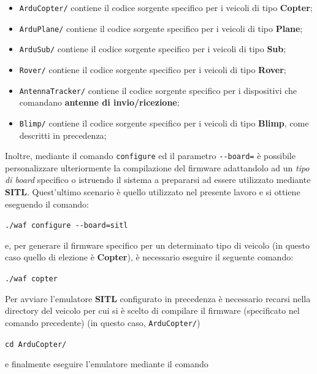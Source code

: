 \documentclass[a4paper, 12pt, oneside]{article}
\theoremstyle{definition}
\begin{document}
\begin{itemize}
    \item \texttt{ArduCopter/} contiene il codice sorgente specifico per i veicoli di tipo \textbf{Copter};
    \item \texttt{ArduPlane/} contiene il codice sorgente specifico per i veicoli di tipo \textbf{Plane};
    \item \texttt{ArduSub/} contiene il codice sorgente specifico per i veicoli di tipo \textbf{Sub};
    \item \texttt{Rover/} contiene il codice sorgente specifico per i veicoli di tipo \textbf{Rover};
    \item \texttt{AntennaTracker/} contiene il codice sorgente specifico per i dispositivi che comandano \textbf{antenne di invio/ricezione};
    \item \texttt{Blimp/} contiene il codice sorgente specifico per i veicoli di tipo \textbf{Blimp}, come descritti in precedenza;
\end{itemize}

Inoltre, mediante il comando \texttt{configure} ed il parametro \texttt{-{}-board=} è possibile personalizzare ulteriormente la compilazione del firmware adattandolo ad un \textit{tipo di board} specifico o istruendo il sistema a prepararsi ad essere utilizzato mediante \textbf{SITL}\cite{how-to-build-ardupilot}. Quest'ultimo scenario è quello utilizzato nel presente lavoro e si ottiene eseguendo il comando:

\begin{center}
    \texttt{./waf configure -{}-board=sitl}
\end{center}

e, per generare il firmware specifico per un determinato tipo di veicolo (in questo caso quello di elezione è \textbf{Copter}), è necessario eseguire il seguente comando:

\begin{center}
    \texttt{./waf copter}
\end{center}

Per avviare l'emulatore \textbf{SITL} configurato in precedenza è necessario recarsi nella directory del veicolo per cui si è scelto di compilare il firmware (specificato nel comando precedente) (in questo caso, \texttt{ArduCopter/})

\begin{center}
    \texttt{cd ArduCopter/}
\end{center}

e finalmente eseguire l'emulatore mediante il comando
\end{document}
